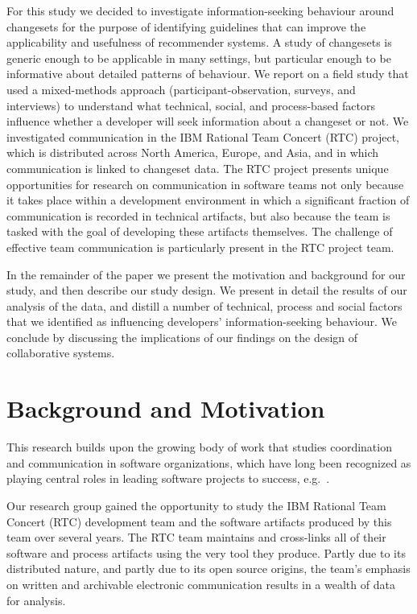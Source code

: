 For this study we decided to investigate information-seeking behaviour around changesets for the purpose of identifying guidelines that can improve the applicability and usefulness of recommender systems. A study of changesets is generic enough to be applicable in many settings, but particular enough to be informative about detailed patterns of behaviour. We report on a field study that used a mixed-methods approach (participant-observation, surveys, and interviews) to understand what technical, social, and process-based factors influence whether a developer will seek information about a changeset or not. We investigated communication in the IBM Rational Team Concert (RTC) project, which is distributed across North America, Europe, and Asia, and in which communication is linked to changeset data. The RTC project presents unique opportunities for research on communication in software teams not only because it takes place within a development environment in which a significant fraction of communication is recorded in technical artifacts, but also because the team is tasked with the goal of developing these artifacts themselves. The challenge of effective team communication is particularly present in the RTC project team. 

In the remainder of the paper we present the motivation and background for our study, and then describe our study design.  We present in detail the results of our analysis of the data, and distill a number of technical, process and social factors that we identified as influencing developers' information-seeking behaviour. We conclude by discussing the implications of our findings on the design of collaborative systems. 

\section{Background and Motivation}
\label{sec:rq}

This research builds upon the growing body of work that studies coordination and communication in software organizations, which have long been recognized as playing central roles in leading software projects to success, e.g.~\cite{kraut:1995coordination,curtis:acm:1988}.  
\vspace{-2pt}

Our research group gained the opportunity to study the IBM Rational Team Concert (RTC) development team and the software artifacts produced by this team over several years. The RTC team maintains and cross-links all of their software and process artifacts using the very tool they produce. Partly due to its distributed nature, and partly due to its open source origins, the team's emphasis on written and archivable electronic communication results in a wealth of data for analysis.
\vspace{-2pt}

